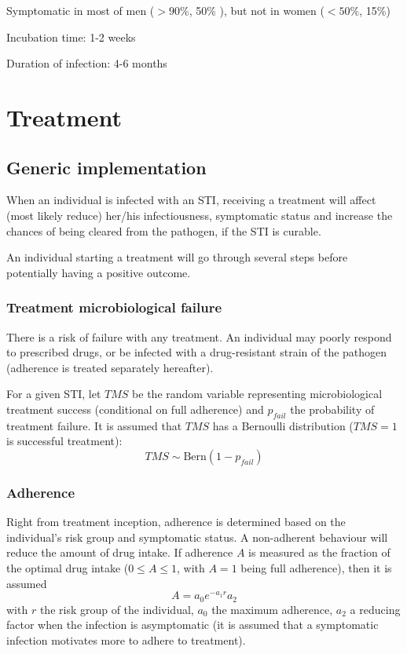 \documentclass[11pt, onecolumn]{article}
\begin{document}
 Symptomatic in most of men ($> 90\%$\cite{Ison:2011eg,Kretzschmar:1996ur}, 50\%\cite{Korenromp:2002gt} ), but not in women ($< 50\%$\cite{Ison:2011eg,Kretzschmar:1996ur}, 15\%\cite{Korenromp:2002gt}) 
 
 Incubation time: 1-2 weeks\cite{Kretzschmar:1996ur}
 
 Duration of infection: 4-6 months \cite{Chen:2010hx,Korenromp:2002gt}

 

\section{Treatment}


\subsection{Generic implementation}

When an individual is infected with an STI, receiving a treatment will affect (most likely reduce) her/his infectiousness, symptomatic status and increase the chances of being cleared from the pathogen, if the STI is curable.

An individual starting a treatment will go through several steps before potentially having a positive outcome. 

\subsubsection{Treatment microbiological failure}

There is a risk of failure with any treatment. An individual may poorly respond to prescribed drugs, or be infected with a drug-resistant strain of the pathogen (adherence is treated separately hereafter).

For a given STI, let $TMS$ be the random variable representing microbiological treatment success (conditional on full adherence) and $p_{fail}$ the probability of treatment failure. It is assumed that $TMS$ has a Bernoulli distribution ($TMS=1$ is successful treatment):
$$TMS \sim \mathrm{Bern}(1- p_{fail})$$


\subsubsection{Adherence}

Right from treatment inception, adherence is determined based on the individual's risk group and symptomatic status. A non-adherent behaviour will reduce the amount of drug intake. If adherence $A$ is measured as the fraction of the optimal drug intake ($0 \leq A\leq 1$, with $A=1$ being full adherence), then it is assumed
$$ A = a_0 e^{-a_1 r} a_2$$
with $r$ the risk group of the individual, $a_0$ the maximum adherence, $a_2$ a reducing factor when the infection is asymptomatic (it is assumed that a symptomatic infection motivates more to adhere to treatment).
\end{document}
